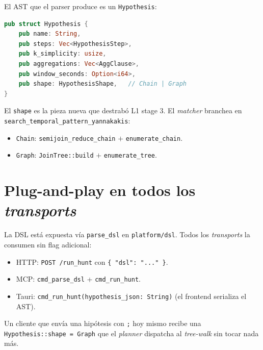 El AST que el parser produce es un \texttt{Hypothesis}:

\begin{lstlisting}[language=Rust]
pub struct Hypothesis {
    pub name: String,
    pub steps: Vec<HypothesisStep>,
    pub k_simplicity: usize,
    pub aggregations: Vec<AggClause>,
    pub window_seconds: Option<i64>,
    pub shape: HypothesisShape,   // Chain | Graph
}
\end{lstlisting}

El \texttt{shape} es la pieza nueva que destrabó L1 stage 3.
El \emph{matcher} branchea en \texttt{search\_temporal\_pattern\_yannakakis}:

\begin{itemize}
    \item \texttt{Chain}: \texttt{semijoin\_reduce\_chain}
    \(+\) \texttt{enumerate\_chain}.
    \item \texttt{Graph}: \texttt{JoinTree::build}
    \(+\) \texttt{enumerate\_tree}.
\end{itemize}

\section{Plug-and-play en todos los \emph{transports}}

La DSL está expuesta vía \texttt{parse\_dsl} en
\texttt{platform/dsl}. Todos los \emph{transports} la consumen sin
flag adicional:

\begin{itemize}
    \item HTTP: \texttt{POST /run\_hunt} con \texttt{\{ "dsl": "..." \}}.
    \item MCP: \texttt{cmd\_parse\_dsl} +
    \texttt{cmd\_run\_hunt}.
    \item Tauri: \texttt{cmd\_run\_hunt(hypothesis\_json: String)}
    (el frontend serializa el AST).
\end{itemize}

Un cliente que envía una hipótesis con \texttt{;} hoy mismo recibe
una \texttt{Hypothesis::shape = Graph} que el \emph{planner} dispatcha
al \emph{tree-walk} sin tocar nada más.

